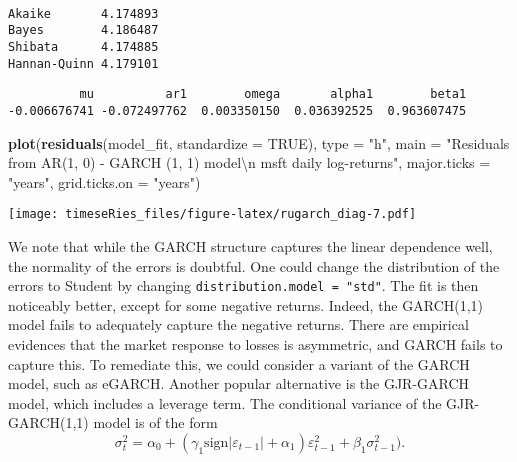 \documentclass[]{book}
\newenvironment{Shaded}{\begin{snugshade}}{\end{snugshade}}
\newcommand{\CharTok}[1]{\textcolor[rgb]{0.31,0.60,0.02}{#1}}
\newcommand{\DataTypeTok}[1]{\textcolor[rgb]{0.13,0.29,0.53}{#1}}
\newcommand{\KeywordTok}[1]{\textcolor[rgb]{0.13,0.29,0.53}{\textbf{#1}}}
\newcommand{\NormalTok}[1]{#1}
\newcommand{\OperatorTok}[1]{\textcolor[rgb]{0.81,0.36,0.00}{\textbf{#1}}}
\newcommand{\OtherTok}[1]{\textcolor[rgb]{0.56,0.35,0.01}{#1}}
\newcommand{\StringTok}[1]{\textcolor[rgb]{0.31,0.60,0.02}{#1}}
\begin{document}
\begin{verbatim}
                     
Akaike       4.174893
Bayes        4.186487
Shibata      4.174885
Hannan-Quinn 4.179101
\end{verbatim}

\begin{Shaded}
\end{Shaded}

\begin{verbatim}
          mu          ar1        omega       alpha1        beta1 
-0.006676741 -0.072497762  0.003350150  0.036392525  0.963607475 
\end{verbatim}

\begin{Shaded}
\begin{Highlighting}[]
\KeywordTok{plot}\NormalTok{(}\KeywordTok{residuals}\NormalTok{(model_fit, }\DataTypeTok{standardize =} \OtherTok{TRUE}\NormalTok{), }\DataTypeTok{type =} \StringTok{"h"}\NormalTok{, }\DataTypeTok{main =} \StringTok{"Residuals from AR(1, 0) - GARCH (1, 1) model}\CharTok{\textbackslash{}n}\StringTok{ msft daily log-returns"}\NormalTok{, }
    \DataTypeTok{major.ticks =} \StringTok{"years"}\NormalTok{, }\DataTypeTok{grid.ticks.on =} \StringTok{"years"}\NormalTok{)}
\end{Highlighting}
\end{Shaded}

\texttt{[image: timeseRies\_files/figure-latex/rugarch\_diag-7.pdf]}

We note that while the GARCH structure captures the linear dependence
well, the normality of the errors is doubtful. One could change the
distribution of the errors to Student by changing
\texttt{distribution.model\ =\ "std"}. The fit is then noticeably
better, except for some negative returns. Indeed, the GARCH(1,1) model
fails to adequately capture the negative returns. There are empirical
evidences that the market response to losses is asymmetric, and GARCH
fails to capture this. To remediate this, we could consider a variant of
the GARCH model, such as eGARCH. Another popular alternative is the
GJR-GARCH model, which includes a leverage term. The conditional
variance of the GJR-GARCH(1,1) model is of the form
\[\sigma^2_t = \alpha_0+(\gamma_1\mathrm{sign}|\varepsilon_{t-1}|+\alpha_1)\varepsilon_{t-1}^2+\beta_1\sigma^2_{t-1}).\]
\end{document}
